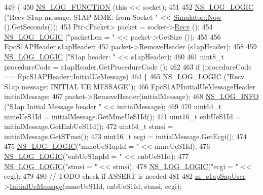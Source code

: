 \begin{DoxyCode}
449 \{
450   \hyperlink{log-macros-disabled_8h_a90b90d5bad1f39cb1b64923ea94c0761}{NS\_LOG\_FUNCTION} (\textcolor{keyword}{this} << socket);
451 
452   \hyperlink{group__logging_ga88acd260151caf2db9c0fc84997f45ce}{NS\_LOG\_LOGIC} (\textcolor{stringliteral}{"Recv S1ap message: S1AP MME: from Socket "} << 
      \hyperlink{classns3_1_1Simulator_ac3178fa975b419f7875e7105be122800}{Simulator::Now} ().GetSeconds());
453   Ptr<Packet> packet = socket->\hyperlink{classns3_1_1Socket_a8949b1f844aae563446f2f4c5be8827a}{Recv} ();
454   \hyperlink{group__logging_ga88acd260151caf2db9c0fc84997f45ce}{NS\_LOG\_LOGIC} (\textcolor{stringliteral}{"packetLen = "} << packet->GetSize ());
455 
456   EpcS1APHeader s1apHeader;
457   packet->RemoveHeader (s1apHeader);
458 
459   \hyperlink{group__logging_ga88acd260151caf2db9c0fc84997f45ce}{NS\_LOG\_LOGIC} (\textcolor{stringliteral}{"S1ap header: "} << s1apHeader);
460 
461   uint8\_t procedureCode = s1apHeader.GetProcedureCode ();
462 
463   \textcolor{keywordflow}{if} (procedureCode == \hyperlink{classns3_1_1EpcS1APHeader_aedd7ba8568bf04ce8960bd840712a63eaf6e59a9d987f46fb18f5113370354521}{EpcS1APHeader::InitialUeMessage})
464   \{
465     \hyperlink{group__logging_ga88acd260151caf2db9c0fc84997f45ce}{NS\_LOG\_LOGIC} (\textcolor{stringliteral}{"Recv S1ap message: INITIAL UE MESSAGE"});
466     EpcS1APInitialUeMessageHeader initialMessage;
467     packet->RemoveHeader(initialMessage);
468     \hyperlink{group__logging_gafbd73ee2cf9f26b319f49086d8e860fb}{NS\_LOG\_INFO} (\textcolor{stringliteral}{"S1ap Initial Message header "} << initialMessage);
469 
470     uint64\_t mmeUeS1Id = initialMessage.GetMmeUeS1Id();
471     uint16\_t enbUeS1Id = initialMessage.GetEnbUeS1Id();
472     uint64\_t stmsi = initialMessage.GetSTmsi();
473     uint16\_t ecgi = initialMessage.GetEcgi();
474 
475     \hyperlink{group__logging_ga88acd260151caf2db9c0fc84997f45ce}{NS\_LOG\_LOGIC}(\textcolor{stringliteral}{"mmeUeS1apId = "} << mmeUeS1Id);
476     \hyperlink{group__logging_ga88acd260151caf2db9c0fc84997f45ce}{NS\_LOG\_LOGIC}(\textcolor{stringliteral}{"enbUeS1apId = "} << enbUeS1Id);
477     \hyperlink{group__logging_ga88acd260151caf2db9c0fc84997f45ce}{NS\_LOG\_LOGIC}(\textcolor{stringliteral}{"stmsi = "} << stmsi);
478     \hyperlink{group__logging_ga88acd260151caf2db9c0fc84997f45ce}{NS\_LOG\_LOGIC}(\textcolor{stringliteral}{"ecgi = "} << ecgi);
479 
480     \textcolor{comment}{// TODO check if ASSERT is needed}
481 
482     \hyperlink{classns3_1_1EpcS1apMme_ab9994a301789a31ce3c324f80266619b}{m\_s1apSapUser}->\hyperlink{classns3_1_1EpcS1apSapMme_ab83587be82f0b614df9addbe261f8052}{InitialUeMessage}(mmeUeS1Id, enbUeS1Id, stmsi, ecgi);

\end{DoxyCode}
